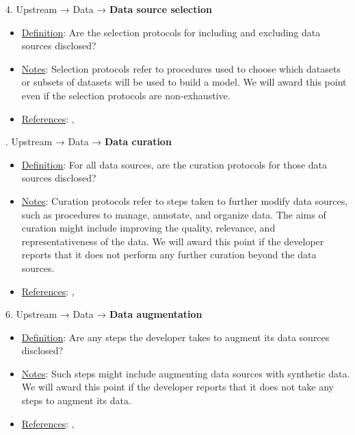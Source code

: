 4. Upstream → Data → \textbf{Data source selection}
\vspace{-\parskip}
\begin{itemize}
\item
\underline{Definition}: Are the selection protocols for including and excluding data sources disclosed?
\item
\underline{Notes}: Selection protocols refer to procedures used to choose which datasets or subsets of datasets will be used to build a model. We will award this point even if the selection protocols are non-exhaustive.
\item
\underline{References}: \citet{gebru2021datasheets}, \citet{hutchinson2021towards}
\end{itemize} \vspace{\baselineskip}


. Upstream → Data → \textbf{Data curation}
\vspace{-\parskip}
\begin{itemize}
\item
\underline{Definition}: For all data sources, are the curation protocols for those data sources disclosed?
\item
\underline{Notes}: Curation protocols refer to steps taken to further modify data sources, such as procedures to manage, annotate, and organize data. The aims of curation might include improving the quality, relevance, and representativeness of the data. We will award this point if the developer reports that it does not perform any further curation beyond the data sources.
\item
\underline{References}: \citet{gebru2021datasheets}, \citet{hutchinson2021towards}
\end{itemize} \vspace{\baselineskip}


6. Upstream → Data → \textbf{Data augmentation}
\vspace{-\parskip}
\begin{itemize}
\item
\underline{Definition}: Are any steps the developer takes to augment its data sources disclosed?
\item
\underline{Notes}: Such steps might include augmenting data sources with synthetic data. We will award this point if the developer reports that it does not take any steps to augment its data.
\item
\underline{References}: \citet{gebru2021datasheets}, \citet{hutchinson2021towards}
\end{itemize} \vspace{\baselineskip}


